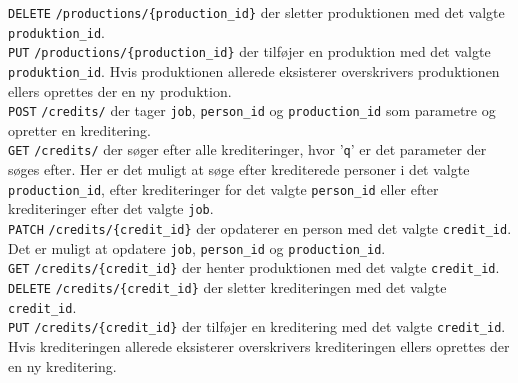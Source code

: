 \noindent
\texttt{DELETE} \texttt{/productions/\{production\_id\}} der sletter produktionen med det valgte \texttt{produktion\_id}.\\

\noindent
\texttt{PUT} \texttt{/productions/\{production\_id\}} der tilføjer en produktion med det valgte \texttt{produktion\_id}. Hvis produktionen allerede eksisterer overskrivers produktionen ellers oprettes der en ny produktion.\\


\texttt{POST} \texttt{/credits/} der tager \texttt{job}, \texttt{person\_id} og \texttt{production\_id} som parametre og opretter en kreditering.\\

\noindent
\texttt{GET} \texttt{/credits/} der søger efter alle krediteringer, hvor '\texttt{q}' er det parameter der søges efter. Her er det muligt at søge efter krediterede personer i det valgte \texttt{production\_id}, efter krediteringer for det valgte \texttt{person\_id} eller efter krediteringer efter det valgte \texttt{job}.\\

\noindent
\texttt{PATCH} \texttt{/credits/\{credit\_id\}} der opdaterer en person med det valgte \texttt{credit\_id}. Det er muligt at opdatere \texttt{job}, \texttt{person\_id} og \texttt{production\_id}.\\

\noindent
\texttt{GET} \texttt{/credits/\{credit\_id\}} der henter produktionen med det valgte \texttt{credit\_id}.\\

\noindent
\texttt{DELETE} \texttt{/credits/\{credit\_id\}} der sletter krediteringen med det valgte \texttt{credit\_id}.\\

\noindent
\texttt{PUT} \texttt{/credits/\{credit\_id\}} der tilføjer en kreditering med det valgte \texttt{credit\_id}. Hvis krediteringen allerede eksisterer overskrivers krediteringen ellers oprettes der en ny kreditering.\\